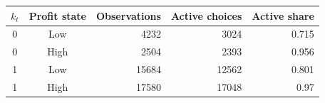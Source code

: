 \begin{tabular}{ccrrr}
\toprule
$k_t$ & Profit state & Observations & Active choices & Active share \\
\midrule
0 & Low & 4232 & 3024 & 0.715 \\
0 & High & 2504 & 2393 & 0.956 \\
1 & Low & 15684 & 12562 & 0.801 \\
1 & High & 17580 & 17048 & 0.97 \\
\bottomrule
\end{tabular}
